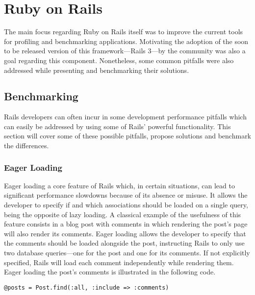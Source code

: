 \section{Ruby on Rails} %
\label{solution:sec:ruby_on_rails}
The main focus regarding Ruby on Rails itself was to improve the current tools for profiling and benchmarking applications. Motivating the adoption of the soon to be released version of this framework---Rails 3---by the community was also a goal regarding this component. Nonetheless, some common pitfalls were also addressed while presenting and benchmarking their solutions.

\begin{comment}
Create tools to improve Rails

Push the Rails community forward
\end{comment}

\subsection{Benchmarking}
Rails developers can often incur in some development performance pitfalls which can easily be addressed by using some of Rails' powerful functionality. This section will cover some of these possible pitfalls, propose solutions and benchmark the differences.

\subsubsection{Eager Loading}
Eager loading a core feature of Rails which, in certain situations, can lead to significant performance slowdowns because of its absence or misuse. It allows the developer to specify if and which associations should be loaded on a single query, being the opposite of lazy loading. A classical example of the usefulness of this feature consists in a blog post with comments in which rendering the post's page will also render its comments. Eager loading allows the developer to specify that the comments should be loaded alongside the post, instructing Rails to only use two database queries---one for the post and one for its comments. If not explicitly specified, Rails will load each comment independently while rendering them. Eager loading the post's comments is illustrated in the following code.
\begin{lstlisting}[xleftmargin=30pt,xrightmargin=30pt]
@posts = Post.find(:all, :include => :comments)
\end{lstlisting}

